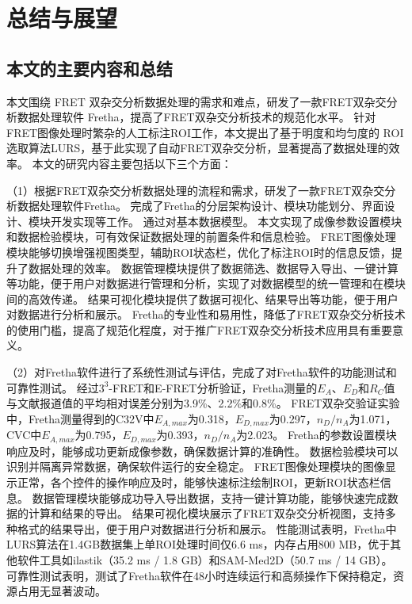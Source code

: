 \chapter{总结与展望}

\section{本文的主要内容和总结}
本文围绕 FRET 双杂交分析数据处理的需求和难点，研发了一款FRET双杂交分析数据处理软件 Fretha，提高了FRET双杂交分析技术的规范化水平。
针对FRET图像处理时繁杂的人工标注ROI工作，本文提出了基于明度和均匀度的 ROI 选取算法LURS，基于此实现了自动FRET双杂交分析，显著提高了数据处理的效率。
本文的研究内容主要包括以下三个方面：

（1）根据FRET双杂交分析数据处理的流程和需求，研发了一款FRET双杂交分析数据处理软件Fretha。
完成了Fretha的分层架构设计、模块功能划分、界面设计、模块开发实现等工作。
通过对基本数据模型。
本文实现了成像参数设置模块和数据检验模块，可有效保证数据处理的前置条件和信息检验。
FRET图像处理模块能够切换增强视图类型，辅助ROI状态栏，优化了标注ROI时的信息反馈，提升了数据处理的效率。
数据管理模块提供了数据筛选、数据导入导出、一键计算等功能，便于用户对数据进行管理和分析，实现了对数据模型的统一管理和在模块间的高效传递。
结果可视化模块提供了数据可视化、结果导出等功能，便于用户对数据进行分析和展示。
Fretha的专业性和易用性，降低了FRET双杂交分析技术的使用门槛，提高了规范化程度，对于推广FRET双杂交分析技术应用具有重要意义。

（2）对Fretha软件进行了系统性测试与评估，完成了对Fretha软件的功能测试和可靠性测试。
经过$3^3$-FRET和E-FRET分析验证，Fretha测量的$E_{A}$、$E_{D}$和$R_C$值与文献报道值的平均相对误差分别为3.9\%、2.2\%和0.8\%。
FRET双杂交验证实验中，Fretha测量得到的C32V中$E_{A,max}$为0.318，$E_{D,max}$为0.297，$n_D/n_A$为1.071，CVC中$E_{A,max}$为0.795，$E_{D,max}$为0.393，$n_D/n_A$为2.023。
Fretha的参数设置模块响应及时，能够成功更新成像参数，确保数据计算的准确性。
数据检验模块可以识别并隔离异常数据，确保软件运行的安全稳定。
FRET图像处理模块的图像显示正常，各个控件的操作响应及时，能够快速标注绘制ROI，更新ROI状态栏信息。
数据管理模块能够成功导入导出数据，支持一键计算功能，能够快速完成数据的计算和结果的导出。
结果可视化模块展示了FRET双杂交分析视图，支持多种格式的结果导出，便于用户对数据进行分析和展示。
性能测试表明，Fretha中LURS算法在1.4GB数据集上单ROI处理时间仅6.6 ms，内存占用800 MB，优于其他软件工具如ilastik（35.2 ms / 1.8 GB）和SAM-Med2D（50.7 ms / 14 GB）。
可靠性测试表明，测试了Fretha软件在48小时连续运行和高频操作下保持稳定，资源占用无显著波动。

